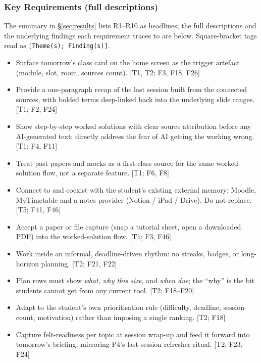 \documentclass[a4paper,11pt]{article}
\begin{document}
\subsubsection*{Key Requirements (full descriptions)}\label{app:requirements}

The summary in \S\ref{sec:results} lists R1--R10 as headlines; the full
descriptions and the underlying findings each requirement traces to are
below. Square-bracket tags read as \texttt{[Theme(s); Finding(s)]}.

\begin{itemize}[leftmargin=2.4em,itemsep=2pt]
  \item[\textbf{R1}] Surface tomorrow's class card on the home screen
        as the trigger artefact (module, slot, room, sources count).
        [T1, T2; F3, F18, F26]
  \item[\textbf{R2}] Provide a one-paragraph recap of the last
        session built from the connected sources, with bolded terms
        deep-linked back into the underlying slide ranges. [T1; F2, F24]
  \item[\textbf{R3}] Show step-by-step worked solutions with
        clear source attribution before any AI-generated text;
        directly address the fear of AI getting the working wrong.
        [T1; F4, F11]
  \item[\textbf{R4}] Treat past papers and mocks as a first-class
        source for the same worked-solution flow, not a separate
        feature. [T1; F6, F8]
  \item[\textbf{R5}] Connect to and coexist with the student's
        existing external memory: Moodle, MyTimetable and a notes
        provider (Notion / iPad / Drive). Do not replace.
        [T5; F41, F46]
  \item[\textbf{R6}] Accept a paper or file capture (snap a tutorial
        sheet, open a downloaded PDF) into the worked-solution
        flow. [T1; F3, F46]
  \item[\textbf{R7}] Work inside an informal, deadline-driven
        rhythm: no streaks, badges, or long-horizon planning.
        [T2; F21, F22]
  \item[\textbf{R8}] Plan rows must show \emph{what}, \emph{why this
        size}, and \emph{when due}; the ``why'' is the bit students
        cannot get from any current tool. [T2; F18--F20]
  \item[\textbf{R9}] Adapt to the student's own prioritisation rule
        (difficulty, deadline, session-count, motivation) rather
        than imposing a single ranking. [T2; F18]
  \item[\textbf{R10}] Capture felt-readiness per topic at session
        wrap-up and feed it forward into tomorrow's briefing,
        mirroring P4's last-session refresher ritual.
        [T2; F23, F24]
\end{itemize}
\end{document}

